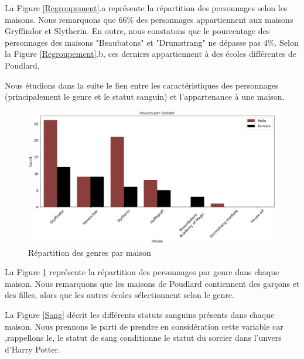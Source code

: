 \documentclass[11pt]{article}
\begin{document}
\begin{center}
La Figure \ref{Regroupement}.a représente la répartition des personnages selon les maisons.
Nous remarquons que 66\% des personnages appartiennent aux maisons Gryffindor et Slytherin.
En outre, nous constatons que le pourcentage des personnages des maisons "Beaubatons" et "Drumstrang" ne dépasse pas 4\%.
Selon la Figure \ref{Regroupement}.b, ces dernirrs appartiennent à des écoles différentes de Poudlard.\par

Nous étudions dans la suite le lien entre les caractéristiques des personnages (principalement le genre et le statut sanguin) et l'appartenance à une maison.\par

\begin{figure}[hbt!]
    \centering
    \includegraphics[width= 16 cm]{./figures/gender.png}
    \caption{Répartition des genres par maison}
    \label{Répartition}
\end{figure}
\FloatBarrier

La Figure \ref{Répartition} représente la répartition des personnages par genre dans chaque maison. Nous remarquons que les maisons de Poudlard contiennent des garçons et des filles, alors que les autres écoles sélectionnent selon le genre.\par

La Figure \ref{Sang} décrit les différents statuts sanguins présents dans chaque maison. Nous prennons le parti de prendre en considération cette variable car ,rappellons le, le statut de sang conditionne le statut du sorcier dans l'unvers d'Harry Potter.



\end{center}
\end{document}
